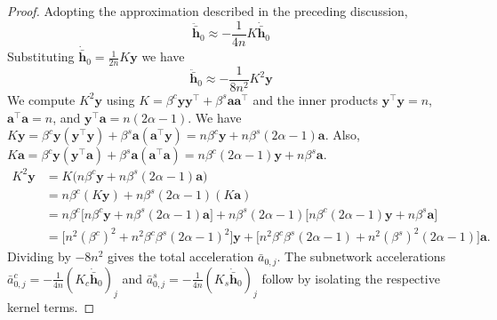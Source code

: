 \documentclass[letter,11pt]{article}
\begin{document}
\begin{proof}
    
    Adopting the approximation described in the preceding discussion,
    \begin{equation}
        \ddot{\bar{\mathbf{h}}}_0 \approx -\frac{1}{4n} K \dot{\bar{\mathbf{h}}}_0
    \end{equation}
    Substituting $\dot{\bar{\mathbf{h}}}_0 = \frac{1}{2n} K \mathbf{y}$ we have
    \begin{equation}
        \ddot{\bar{\mathbf{h}}}_0 \approx -\frac{1}{8n^2} K^2 \mathbf{y}
    \end{equation}
    We compute $K^2 \mathbf{y}$ using $K = \beta^c \mathbf{y}\mathbf{y}^\top + \beta^s \mathbf{a}\mathbf{a}^\top$ and the inner products $\mathbf{y}^\top\mathbf{y}=n$, $\mathbf{a}^\top\mathbf{a}=n$, and $\mathbf{y}^\top\mathbf{a}=n(2\alpha-1)$. We have
    $K\mathbf{y} = \beta^c \mathbf{y}(\mathbf{y}^\top \mathbf{y}) + \beta^s \mathbf{a}(\mathbf{a}^\top \mathbf{y}) = n\beta^c \mathbf{y} + n\beta^s(2\alpha-1)\mathbf{a}$. Also,
    $K\mathbf{a} = \beta^c \mathbf{y}(\mathbf{y}^\top \mathbf{a}) + \beta^s \mathbf{a}(\mathbf{a}^\top \mathbf{a}) = n\beta^c(2\alpha-1)\mathbf{y} + n\beta^s\mathbf{a}$.
    \begin{align*}
    K^2\mathbf{y}
    &= K\bigl(n\beta^c \mathbf{y} + n\beta^s(2\alpha-1)\mathbf{a}\bigr) \\
    &= n\beta^c(K\mathbf{y}) + n\beta^s(2\alpha-1)(K\mathbf{a}) \\
    &= n\beta^c \bigl[n\beta^c \mathbf{y} + n\beta^s(2\alpha-1)\mathbf{a}\bigr] + n\beta^s(2\alpha-1)\bigl[n\beta^c(2\alpha-1)\mathbf{y} + n\beta^s\mathbf{a}\bigr] \\
    &= \bigl[n^2(\beta^c)^2 + n^2\beta^c\beta^s(2\alpha-1)^2\bigr]\mathbf{y} + \bigl[n^2\beta^c\beta^s(2\alpha-1) + n^2(\beta^s)^2(2\alpha-1)\bigr]\mathbf{a}.
    \end{align*}
    Dividing by $-8n^2$ gives the total acceleration $\bar{a}_{0,j}$. The subnetwork accelerations $\bar{a}_{0,j}^c = -\frac{1}{4n} (K_c \dot{\bar{\mathbf{h}}}_0)_j$ and $\bar{a}_{0,j}^s = -\frac{1}{4n} (K_s \dot{\bar{\mathbf{h}}}_0)_j$ follow by isolating the respective kernel terms.
\end{proof}
\end{document}
